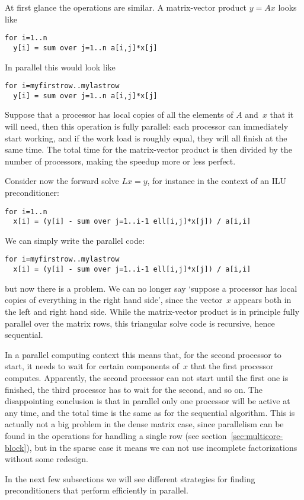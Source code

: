 At first glance the operations are similar. A matrix-vector product
$y=Ax$ looks like
\begin{verbatim}
for i=1..n
  y[i] = sum over j=1..n a[i,j]*x[j]
\end{verbatim}
In parallel this would look like
\begin{verbatim}
for i=myfirstrow..mylastrow
  y[i] = sum over j=1..n a[i,j]*x[j]
\end{verbatim}
Suppose that a processor has local copies of all the elements of $A$
and~$x$ that it will need, then this operation is fully parallel: each
processor can immediately start working, and if the work load is
roughly equal, they will all finish at the same time. The total time
for the matrix-vector product is then divided by the number of
processors, making the speedup more or less perfect.

Consider now the forward solve $Lx=y$, for instance in the context of
an \ac{ILU} preconditioner:
\begin{verbatim}
for i=1..n
  x[i] = (y[i] - sum over j=1..i-1 ell[i,j]*x[j]) / a[i,i]
\end{verbatim}
We can simply write the parallel code:
\begin{verbatim}
for i=myfirstrow..mylastrow
  x[i] = (y[i] - sum over j=1..i-1 ell[i,j]*x[j]) / a[i,i]
\end{verbatim}
but now there is a problem. We can no longer say `suppose a processor
has local copies of everything in the right hand side', since the
vector~$x$ appears both in the left and right hand side. While the
matrix-vector product is in principle fully parallel over the matrix
rows, this triangular solve code is recursive, hence sequential.

In a parallel computing context this means that, for the second
processor to start, it needs to wait for certain components of~$x$
that the first processor computes. Apparently, the second processor
can not start until the first one is finished, the third processor has
to wait for the second, and so on. The disappointing conclusion is
that in parallel only one processor will be active at any time, and
the total time is the same as for the sequential algorithm. This is
actually not a big problem in the dense matrix case, since parallelism
can be found in the operations for handling a single row (see
section~\ref{sec:multicore-block}), but in the sparse case it means we
can not use incomplete factorizations without some redesign.

In the next few subsections we will see different strategies for
finding preconditioners that perform efficiently in parallel.

